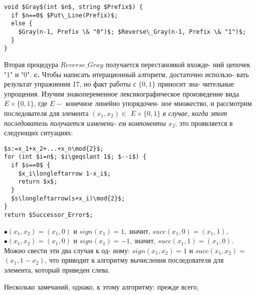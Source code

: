 \begin{lstlisting}[mathescape=true]
void $Gray$(int $n$, string $Prefix$) {
  if $n==0$ $Put\_Line(Prefix)$;
  else {
    $Gray(n-1, Prefix \& "0")$; $Reverse\_Gray(n-1, Prefix \& "1")$;
  }
}
\end{lstlisting}
\hspace*{15pt}Вторая процедура $Reverse\_Gray$ получается перестановкой вхожде-\linebreak
ний цепочек "1" и "0".\newline
\hspace*{15pt}\textbf{c.} Чтобы написать итерационный алгоритм, достаточно использо­-\linebreak
вать результат упражнения 17, но факт работы с $\{0,1\}$ приносит зна-\linebreak
чительные упрощения. Изучим знакопеременное лексикографическое произведение вида $E\times\{0,1\}$, где $E-$ конечное линейно упорядочен-\linebreak
ное множество, и рассмотрим последователя для элемента $(x_1,x_2)\in$\linebreak
$E\times\{0,1\}$ \textit{в случае, когда этот последователь получается изменени-\linebreak
ем компоненты} $x_2$; это проявляется в следующих ситуациях:
\begin{multicols}{2}
\begin{lstlisting}[mathescape=true, caption=Код Грея]
$s:=x_1+x_2+...+x_n\mod{2}$;
for (int $i=n$; $i\geqslant 1$; $--i$) {
  if $s==0$ {
    $x_i\longleftarrow 1-x_i$;
    return $x$;
  }
  $s\longleftarrow(s+x_i)\mod{2}$;
}
return $Successor_Error$;
\end{lstlisting}
\columnbreak
$\bullet (x_1,x_2)=(x_1,0)$ и $sign(x_1)=1$,\newline
значит, $succ(x_1,0)=(x_1,1)$,\newline
$\bullet (x_1,x_2)=(x_1,0)$ и $sign(x_1)=-1$,\newline
значит, $succ(x_1,1)=(x_1,0)$.\newline
Можно свести эти два случая к од-\newline
ному: $sign(x_1,x_2)=1$ и $succ(x_1,x_2)=$\linebreak
$(x_1,1-x_2)$, что приводит к алгоритму\linebreak
вычисления последователя для элемента,\linebreak
который приведен слева.
\end{multicols}
\hspace*{15pt}Несколько замечаний, однако, к этому алгоритму: прежде всего,\linebreak
